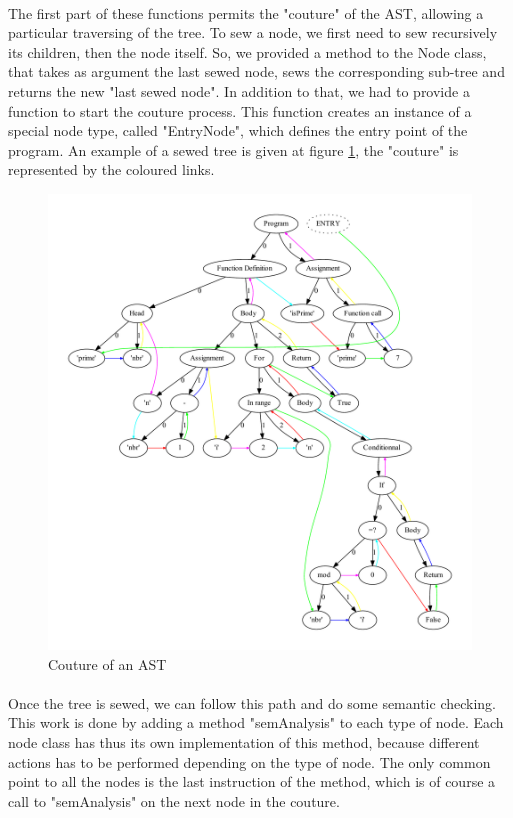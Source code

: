 \documentclass[12pt,a4paper]{article}
\begin{document}
\paragraph{}
The first part of these functions permits the "couture" of the AST, allowing a particular traversing of the tree. To sew a node, we first need to sew recursively its children, then the node itself. So, we provided a method to the Node class, that takes as argument the last sewed node, sews the corresponding sub-tree and returns the new "last sewed node". In addition to that, we had to provide a function to start the couture process. This function creates an instance of a special node type, called "EntryNode", which defines the entry point of the program. An example of a sewed tree is given at figure \ref{ast-threaded}, the "couture" is represented by the coloured links.

\begin{figure}[ht]
    \center
    \includegraphics[scale=0.55]{figures/ast-threaded-example.pdf}
    \caption{Couture of an AST}
    \label{ast-threaded}
\end{figure}

\paragraph{}
Once the tree is sewed, we can follow this path and do some semantic checking. This work is done by adding a method "semAnalysis" to each type of node. Each node class has thus its own implementation of this method, because different actions has to be performed depending on the type of node. The only common point to all the nodes is the last instruction of the method, which is of course a call to "semAnalysis" on the next node in the couture.
\end{document}
